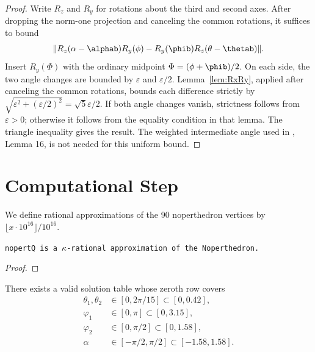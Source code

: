 \begin{proof}
\leanok
Write $R_z$ and $R_y$ for rotations about the third and second axes.
After dropping the norm-one projection and canceling the common rotations,
it suffices to bound
\[
  \|R_z(\alpha-\alphab)R_y(\phi)
       -R_y(\phib)R_z(\theta-\thetab)\|.
\]
Insert $R_y(\Phi)$ with the ordinary midpoint $\Phi=(\phi+\phib)/2$.
On each side, the two angle changes are bounded by $\varepsilon$ and
$\varepsilon/2$. Lemma~\ref{lem:RxRy}, applied after canceling the common
rotations, bounds each difference strictly by
$\sqrt{\varepsilon^2+(\varepsilon/2)^2}=\sqrt{5}\varepsilon/2$.
If both angle changes vanish, strictness follows from $\varepsilon>0$;
otherwise it follows from the equality condition in that lemma.
The triangle inequality gives the result. The weighted intermediate angle
used in \cite{polyhedron.without.rupert}, Lemma 16, is not needed for this
uniform bound.
\end{proof}


\chapter{Computational Step}

\begin{definition}\label{def:nopertQ}\leanok
  We define rational approximations of the 90 noperthedron vertices
  by $\lfloor x \cdot 10^{16} \rfloor/10^{16}$.
\end{definition}

\begin{theorem}
  \label{thm:nopertQ_approximate}
  \leanok
{}
\tt{nopertQ} is a $\kappa$-rational approximation of the Noperthedron.
\end{theorem}
\begin{proof}\leanok
\end{proof}

\begin{theorem}
\label{thm:exists_solution_table}
\leanok
There exists a valid solution table whose zeroth row covers
\begin{align*}
\theta_1,\theta_2&\in[0,2\pi/15] \subset [0,0.42], \\
\varphi_1&\in [0,\pi] \subset [0,3.15],\\
\varphi_2&\in [0,\pi/2] \subset [0,1.58],\\
\alpha &\in [-\pi/2,\pi/2] \subset [-1.58,1.58].
\end{align*}
\end{theorem}

